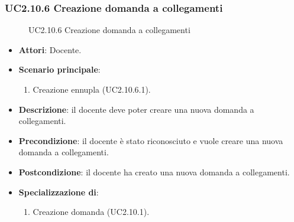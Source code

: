 \subsubsection{UC2.10.6 Creazione domanda a collegamenti}
\begin{figure}[H]
\centering
\noindent{}
\caption{UC2.10.6 Creazione domanda a collegamenti}
\end{figure}
\begin{itemize}
\item \textbf{Attori}: Docente.
\item \textbf{Scenario principale}:
\begin{enumerate}
\item Creazione ennupla (UC2.10.6.1).
\end{enumerate}
\item \textbf{Descrizione}: il docente deve poter creare una nuova domanda a collegamenti.
\item \textbf{Precondizione}: il docente è stato riconosciuto e vuole creare una nuova domanda a collegamenti.
\item \textbf{Postcondizione}: il docente ha creato una nuova domanda a collegamenti.
\item \textbf{Specializzazione di}:
\begin{enumerate}
\item Creazione domanda (UC2.10.1).
\end{enumerate}
\end{itemize}
